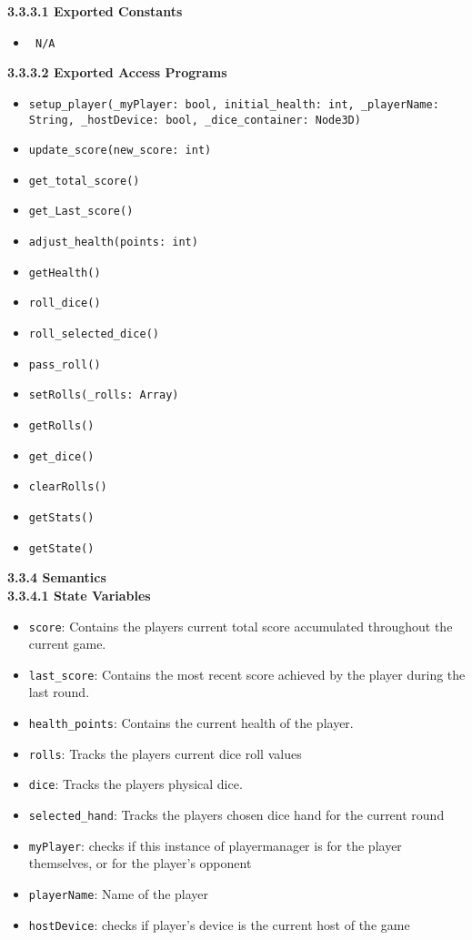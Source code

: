 \documentclass[12pt, titlepage]{article}
\begin{document}
\noindent \textbf{3.3.3.1 Exported Constants}
\begin{itemize}
	\item \texttt{ N/A}
\end{itemize}
\textbf{3.3.3.2 Exported Access Programs}
\begin{itemize}
	\item \texttt{setup\_player(\_myPlayer: bool, initial\_health: int, \_playerName: String, \_hostDevice: bool, \_dice\_container: Node3D)}
    \item \texttt{update\_score(new\_score: int)}
    \item \texttt{get\_total\_score()}
    \item \texttt{get\_Last\_score()}
    \item \texttt{adjust\_health(points: int)}
    \item \texttt{getHealth()}
    \item \texttt{roll\_dice()}
    \item \texttt{roll\_selected\_dice()}
    \item \texttt{pass\_roll()}
    \item \texttt{setRolls(\_rolls: Array)}
    \item \texttt{getRolls()}
    \item \texttt{get\_dice()}
    \item \texttt{clearRolls()}
    \item \texttt{getStats()}
    \item \texttt{getState()}
\end{itemize}

\noindent \textbf{3.3.4 Semantics}\\
\textbf{3.3.4.1 State Variables}\\
\begin{itemize}
    \item \texttt{score}: Contains the players current total score accumulated throughout the current game.
    \item \texttt{last\_score}: Contains the most recent score achieved by the player during the last round.
    \item \texttt{health\_points}: Contains the current health of the player.
    \item \texttt{rolls}: Tracks the players current dice roll values
    \item \texttt{dice}: Tracks the players physical dice.
    \item \texttt{selected\_hand}: Tracks the players chosen dice hand for the current round 
    \item \texttt{myPlayer}: checks if this instance of playermanager is for the player themselves, or for the player's opponent
    \item \texttt{playerName}: Name of the player
    \item \texttt{hostDevice}: checks if player's device is the current host of the game
\end{itemize}
\end{document}
